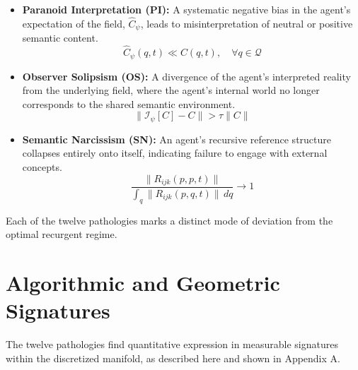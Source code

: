 \begin{itemize}
    \item \textbf{Paranoid Interpretation (PI):} A systematic negative bias in the agent's expectation of the field, \(\hat{C}_{\psi}\), leads to misinterpretation of neutral or positive semantic content.
    \begin{equation}
    \hat{C}_{\psi}(q,t) \ll C(q,t), \quad \forall q \in \mathcal{Q}
    \end{equation}

    \item \textbf{Observer Solipsism (OS):} A divergence of the agent's interpreted reality from the underlying field, where the agent's internal world no longer corresponds to the shared semantic environment.
    \begin{equation}
    \|\mathcal{I}_{\psi}[C] - C\| > \tau \|C\|
    \end{equation}

    \item \textbf{Semantic Narcissism (SN):} An agent's recursive reference structure collapses entirely onto itself, indicating failure to engage with external concepts.
    \begin{equation}
    \frac{\|R_{ijk}(p,p,t)\|}{\int_q \|R_{ijk}(p,q,t)\| \, dq} \to 1
    \end{equation}
\end{itemize}

Each of the twelve pathologies marks a distinct mode of deviation from the optimal recurgent regime.

\section{Algorithmic and Geometric Signatures}

The twelve pathologies find quantitative expression in measurable signatures within the discretized manifold, as described here and shown in Appendix A.

